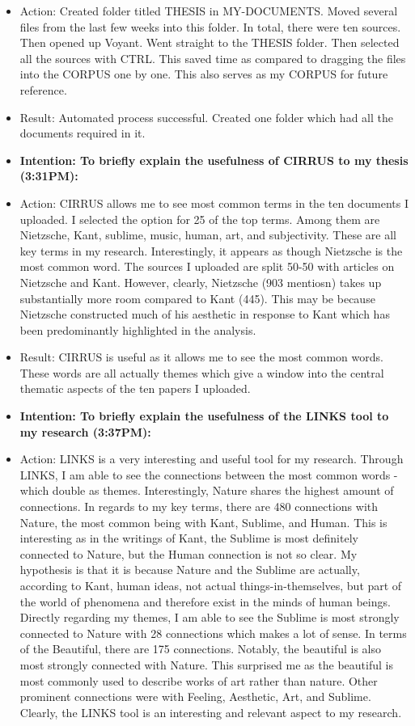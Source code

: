 \documentclass[a4paper,12pt]{article}
\begin{document}
\begin{itemize}
\item Action: Created folder titled THESIS in MY-DOCUMENTS. Moved several files from the last few weeks into this folder. In total, there were ten sources. Then opened up Voyant. Went straight to the THESIS folder. Then selected all the sources with CTRL. This saved time as compared to dragging the files into the CORPUS one by one. This also serves as my CORPUS for future reference.  


\item Result: Automated process successful. Created one folder which had all the documents required in it. 


\item \textbf{Intention: To briefly explain the usefulness of CIRRUS to my thesis (3:31PM):}


\item Action: CIRRUS allows me to see most common terms in the ten documents I uploaded. I selected the option for 25 of the top terms. Among them are Nietzsche, Kant, sublime, music, human, art, and subjectivity. These are all key terms in my research. Interestingly, it appears as though Nietzsche is the most common word. The sources I uploaded are split 50-50 with articles on Nietzsche and Kant. However, clearly, Nietzsche (903 mentiosn) takes up substantially more room compared to Kant (445). This may be because Nietzsche constructed much of his aesthetic in response to Kant which has been predominantly highlighted in the analysis. 


\item Result: CIRRUS is useful as it allows me to see the most common words. These words are all actually themes which give a window into the central thematic aspects of the ten papers I uploaded. 


\item \textbf{Intention: To briefly explain the usefulness of the LINKS tool to my research (3:37PM):}


\item Action: LINKS is a very interesting and useful tool for my research. Through LINKS, I am able to see the connections between the most common words - which double as themes. Interestingly, Nature shares the highest amount of connections. In regards to my key terms, there are 480 connections with Nature, the most common being with Kant, Sublime, and Human. This is interesting as in the writings of Kant, the Sublime is most definitely connected to Nature, but the Human connection is not so clear. My hypothesis is that it is because Nature and the Sublime are actually, according to Kant, human ideas, not actual things-in-themselves, but part of the world of phenomena and therefore exist in the minds of human beings. Directly regarding my themes, I am able to see the Sublime is most strongly connected to Nature with 28 connections which makes a lot of sense. In terms of the Beautiful, there are 175 connections. Notably, the beautiful is also most strongly connected with Nature. This surprised me as the beautiful is most commonly used to describe works of art rather than nature. Other prominent connections were with Feeling, Aesthetic, Art, and Sublime. Clearly, the LINKS tool is an interesting and relevant aspect to my research. 



\end{itemize}
\end{document}
